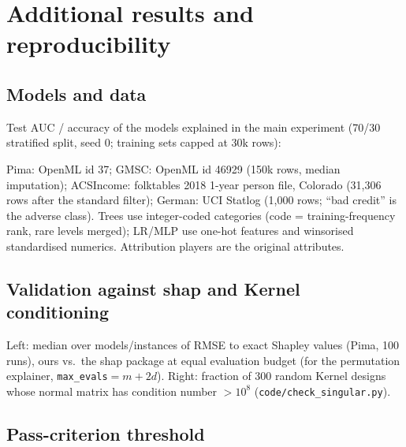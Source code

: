 \documentclass{article}
\begin{document}



\newpage
\appendix
\onecolumn
\section{Additional results and reproducibility}
\subsection{Models and data}\label{app:models}
Test AUC / accuracy of the models explained in the main experiment (70/30 stratified split, seed 0; training sets capped at 30k rows):

\begin{center}\small\end{center}
Pima: OpenML id 37; GMSC: OpenML id 46929 (150k rows, median imputation); ACSIncome: folktables 2018 1-year person file, Colorado (31,306 rows after the standard filter); German: UCI Statlog (1,000 rows; ``bad credit'' is the adverse class). Trees use integer-coded categories (code = training-frequency rank, rare levels merged); LR/MLP use one-hot features and winsorised standardised numerics. Attribution players are the original attributes.

\subsection{Validation against shap and Kernel conditioning}\label{app:valid}
\begin{center}\small\hspace{2em}\end{center}
Left: median over models/instances of RMSE to exact Shapley values (Pima, 100 runs), ours vs.\ the shap package at equal evaluation budget (for the permutation explainer, \texttt{max\_evals}$=m+2d$). Right: fraction of 300 random Kernel designs whose normal matrix has condition number $>10^8$ (\texttt{code/check\_singular.py}).

\subsection{Pass-criterion threshold}\label{app:thr}
\begin{center}\small\end{center}
\end{document}
